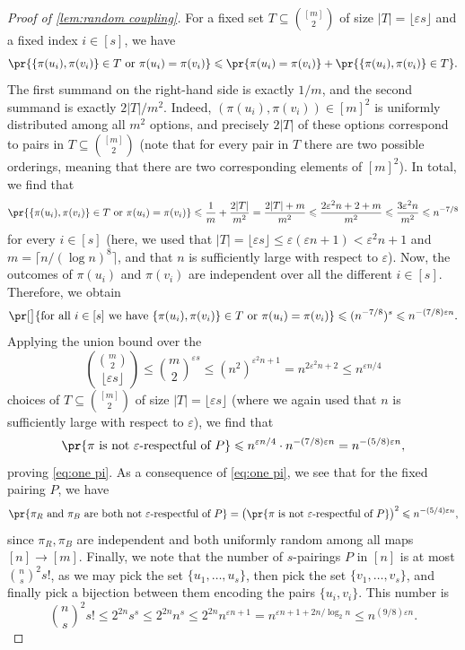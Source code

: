 \documentclass[11pt,reqno,oneside]{amsart}
\theoremstyle{definition}
\newcommand\ab[1]{\lvert#1\rvert}
\newcommand\1{\mathbf{1}}
\newcommand{\eps}{\varepsilon}
\let\leq\leqslant
\begin{document}
\begin{proof}[Proof of \cref{lem:random coupling}]
	For a fixed set $T \subseteq \binom{[m]}2$ of size $\ab T  =  \lfloor \varepsilon s\rfloor$ and a fixed index $i \in [s]$, we have
    \[\pr{\{\pi(u_i),\pi(v_i)\} \in T \text{ or }\pi(u_i)=\pi(v_i)} \leq \pr{\pi(u_i)=\pi(v_i)} + \pr{\{\pi(u_i),\pi(v_i)\}\in T}.\]
    The first summand on the right-hand side is exactly $1/m$, and the second summand is exactly $2|T|/m^2$. Indeed, $(\pi(u_i),\pi(v_i))\in [m]^2$ is uniformly distributed among all $m^2$ options, and precisely $2|T|$ of these options correspond to pairs in $T \subseteq \binom{[m]}2$ (note that for every pair in $T$ there are two possible orderings, meaning that there are two corresponding elements of $[m]^2$). In total, we find that
    \[
        \pr{\{\pi(u_i),\pi(v_i)\} \in T \text{ or }\pi(u_i)=\pi(v_i)} \leq \frac{1}{m}+\frac{2|T|}{m^2}=\frac{2|T|+m}{m^2}\leq \frac{2\eps^2 n+2+m}{m^2}\leq \frac{3\eps^2 n}{m^2}\leq n^{-7/8}
    \]
    for every $i \in [s]$ (here, we used that $\ab T  =  \lfloor \varepsilon s\rfloor\leq \eps(\eps n+1)< \eps^2 n+1$ and $m=\lceil n/(\log n)^{8}\rceil$, and that $n$ is sufficiently large with respect to $\eps$). Now, the outcomes of $\pi(u_i)$ and $\pi(v_i)$ are independent over all the different $i \in [s]$. Therefore, we obtain
	\[
		\pr[\big]{\text{for all }i \in [s]\text{ we have }\{\pi(u_i),\pi(v_i)\} \in T \text{ or }\pi(u_i)=\pi(v_i)} \leq (n^{-7/8})^{s}\leq n^{-(7/8)\eps n}.
	\]
	Applying the union bound over the
    \[\binom{\binom m2}{\lfloor \varepsilon s\rfloor}\leq \binom m2^{\varepsilon s}\leq (n^2)^{\eps^2n+1}= n^{2\eps^2n+2}\leq n^{\eps n/4}\]
    choices of $T\subseteq \binom{[m]}2$ of size $\ab T =  \lfloor \varepsilon s\rfloor$ (where we again used that $n$ is sufficiently large with respect to $\eps$), we find that
    \[\pr{\pi \text{ is not }\varepsilon\text{-respectful of }P} \leq  n^{\eps n/4}\cdot n^{-(7/8)\eps n}= n^{-(5/8)\eps n},\]
	proving \eqref{eq:one pi}. As a consequence of \eqref{eq:one pi}, we see that for the fixed pairing $P$, we have
    \[\pr{\pi_R \text{ and }\pi_B\text{ are both not }\varepsilon\text{-respectful of }P} = \big(\pr{\pi \text{ is not }\varepsilon\text{-respectful of }P}\big)^2\leq n^{-(5/4)\eps n},\]
	since $\pi_R,\pi_B$ are independent and both uniformly random among all maps $[n]\to [m]$. Finally, 
	we note that the number of $s$-pairings $P$ in $[n]$ is 
	at most $\binom n{s}^2 s!$, as we may pick the set $\{u_1,\dots,u_{s}\}$, then pick the set $\{v_1,\dots,v_{s}\}$, and finally pick a bijection between them encoding the pairs $\{u_i,v_i\}$. This number is
	\[
		\binom n{s}^2 s! \leq 2^{2n} s^{s} \leq 2^{2n} n^{s} \leq 2^{2n} n^{\eps n+1}=n^{\eps n+1+2n/{\log_2 n}}\leq n^{(9/8)\eps n}.
\]
\end{proof}
\end{document}
